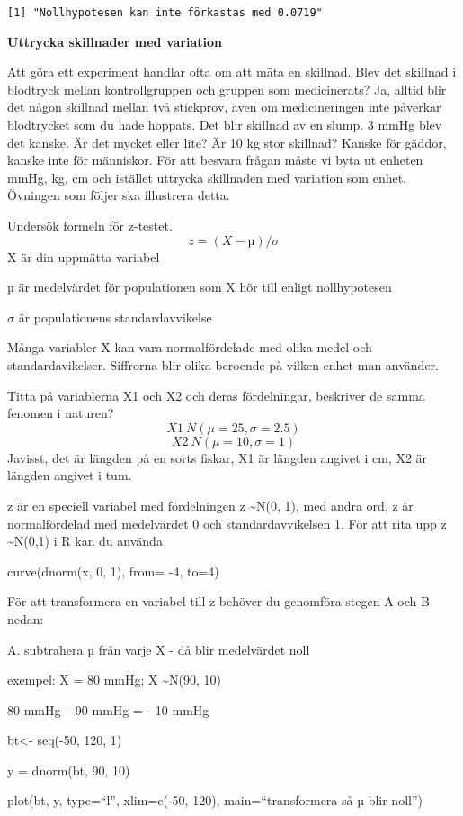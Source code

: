 \documentclass[
  letterpaper,
  DIV=11,
  numbers=noendperiod]{scrartcl}
\begin{document}
\begin{verbatim}
[1] "Nollhypotesen kan inte förkastas med 0.0719"
\end{verbatim}

\textbf{Uttrycka skillnader med variation}

Att göra ett experiment handlar ofta om att mäta en skillnad. Blev det
skillnad i blodtryck mellan kontrollgruppen och gruppen som
medicinerats? Ja, alltid blir det någon skillnad mellan två stickprov,
även om medicineringen inte påverkar blodtrycket som du hade hoppats.
Det blir skillnad av en slump. 3 mmHg blev det kanske. Är det mycket
eller lite? Är 10 kg stor skillnad? Kanske för gäddor, kanske inte för
människor. För att besvara frågan måste vi byta ut enheten mmHg, kg, cm
och istället uttrycka skillnaden med variation som enhet. Övningen som
följer ska illustrera detta.

Undersök formeln för z-testet. \[
z = (X-µ)/σ
\] X är din uppmätta variabel

\(µ\) är medelvärdet för populationen som X hör till enligt
nollhypotesen

\(σ\) är populationens standardavvikelse

Många variabler X kan vara normalfördelade med olika medel och
standardavikelser. Siffrorna blir olika beroende på vilken enhet man
använder.

Titta på variablerna X1 och X2 och deras fördelningar, beskriver de
samma fenomen i naturen? \[
X1 ~ N(\mu = 25 , \sigma = 2.5)
\] \[
X2 ~ N(\mu = 10, \sigma = 1)
\] Javisst, det är längden på en sorts fiskar, X1 är längden angivet i
cm, X2 är längden angivet i tum.

z är en speciell variabel med fördelningen z \textasciitilde N(0, 1),
med andra ord, z är normalfördelad med medelvärdet 0 och
standardavvikelsen 1. För att rita upp z \textasciitilde N(0,1) i R kan
du använda

curve(dnorm(x, 0, 1), from= -4, to=4)

För att transformera en variabel till z behöver du genomföra stegen A
och B nedan:

A. subtrahera µ från varje X - då blir medelvärdet noll

exempel: X = 80 mmHg; X \textasciitilde N(90, 10)

80 mmHg -- 90 mmHg = - 10 mmHg

bt\textless- seq(-50, 120, 1)

y = dnorm(bt, 90, 10)

plot(bt, y, type=``l'', xlim=c(-50, 120), main=``transformera så µ blir
noll'')
\end{document}
